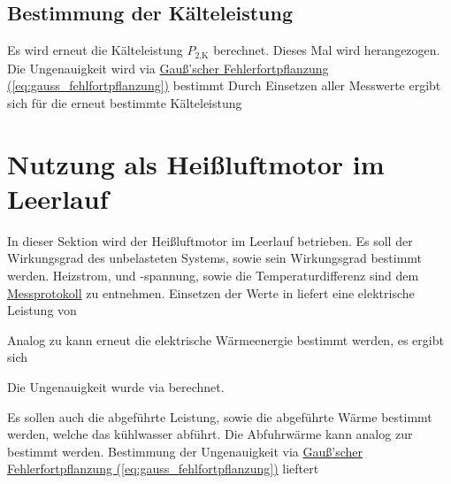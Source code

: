 \subsection{Bestimmung der Kälteleistung}
Es wird erneut die Kälteleistung $P_\text{2,K}$ berechnet. Dieses Mal wird  herangezogen. Die Ungenauigkeit wird via \hyperref[eq:gauss_fehlfortpflanzung]{Gauß'scher Fehlerfortpflanzung (\ref*{eq:gauss_fehlfortpflanzung})} bestimmt
Durch Einsetzen aller Messwerte ergibt sich für die erneut bestimmte Kälteleistung


\section{Nutzung als Heißluftmotor im Leerlauf}
\label{sec:A3}

In dieser Sektion wird der Heißluftmotor im Leerlauf betrieben. Es soll der Wirkungsgrad des unbelasteten Systems, sowie sein Wirkungsgrad bestimmt werden. Heizstrom, und -spannung, sowie die Temperaturdifferenz sind dem \hyperref[ch:Protokoll]{Messprotokoll} zu entnehmen. Einsetzen der Werte in  liefert eine elektrische Leistung von

Analog zu  kann erneut die elektrische Wärmeenergie bestimmt werden, es ergibt sich

Die Ungenauigkeit wurde via
berechnet.

Es sollen auch die abgeführte Leistung, sowie die abgeführte Wärme bestimmt werden, welche das kühlwasser abführt. Die Abfuhrwärme kann analog zur  bestimmt werden. Bestimmung der Ungenauigkeit via \hyperref[eq:gauss_fehlfortpflanzung]{Gauß'scher Fehlerfortpflanzung (\ref*{eq:gauss_fehlfortpflanzung})} lieftert

